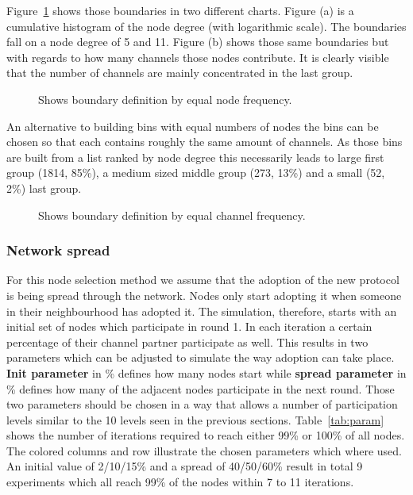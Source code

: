 \documentclass[final]{fhnwreport}       %
\begin{document}
Figure~\ref{fig:eqfreq} shows those boundaries in two different charts. Figure (a) is a cumulative histogram of the node degree (with logarithmic scale). The boundaries fall on a node degree of 5 and 11. Figure (b) shows those same boundaries but with regards to how many channels those nodes contribute. It is clearly visible that the number of channels are mainly concentrated in the last group. 



\begin{figure}[H]
\centering
{}\quad
{}
\caption{Shows boundary definition by equal node frequency.}
\label{fig:eqfreq}
\end{figure}

An alternative to building bins with equal numbers of nodes the bins can be chosen so that each contains roughly the same amount of channels. As those bins are built from a list ranked by node degree this necessarily leads to large first group (1814, 85\%), a medium sized middle group (273, 13\%) and a small (52, 2\%) last group. 

\begin{figure}[H]
\centering
{}\quad
{}
\caption{Shows boundary definition by equal channel frequency.}
\label{fig:eqfreqchannel}
\end{figure}
\subsubsection{Network spread}
For this node selection method we assume that the adoption of the new protocol is being spread through the network. Nodes only start adopting it when someone in their neighbourhood has adopted it. The simulation, therefore, starts with an initial set of nodes which participate in round 1. In each iteration a certain percentage of their channel partner participate as well. This results in two parameters which can be adjusted to simulate the way adoption can take place. \textbf{Init parameter} in \% defines how many nodes start while \textbf{spread parameter} in \% defines how many of the adjacent nodes participate in the next round. Those two parameters should be chosen in a way that allows a number of participation levels similar to the 10 levels seen in the previous sections. Table~\ref{tab:param} shows the number of iterations required to reach either 99\% or 100\% of all nodes. The colored columns and row illustrate the chosen parameters which where used. An initial value of 2/10/15\% and a spread of 40/50/60\% result in total 9 experiments which all reach 99\% of the nodes within 7 to 11 iterations.
\end{document}
